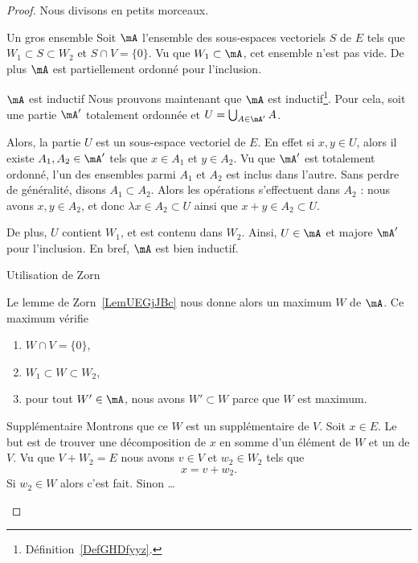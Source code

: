 \begin{proof}
    Nous divisons en petits morceaux.
    \begin{subproof}
        \item[Un gros ensemble]
            Soit \( \mA\) l'ensemble des sous-espaces vectoriels \( S\) de \( E\) tels que \( W_1\subset S\subset W_2\) et \( S\cap V=\{ 0 \}\). Vu que \( W_1\subset \mA\), cet ensemble n'est pas vide. De plus \( \mA\) est partiellement ordonné pour l'inclusion.
        \item[\( \mA\) est inductif]
            Nous prouvons maintenant que \( \mA\) est inductif\footnote{Définition~\ref{DefGHDfyyz}.}. Pour cela, soit une partie \( \mA'\) totalement ordonnée et \( U=\bigcup_{A\in \mA'}A\).

            Alors, la partie \( U\) est un sous-espace vectoriel de \( E\). En effet si \( x,y\in U\), alors il existe \( A_1,A_2\in\mA'\) tels que \( x\in A_1\) et \( y\in A_2\). Vu que \( \mA'\) est totalement ordonné, l'un des ensembles parmi \( A_1\) et \( A_2\) est inclus dans l'autre. Sans perdre de généralité, disons \( A_1\subset A_2\). Alors les opérations s'effectuent dans \( A_2 \) : nous avons \( x,y\in A_2\), et donc \( \lambda x\in A_2\subset U\) ainsi que \( x+y\in A_2\subset U\).

            De plus, \( U \) contient \( W_1 \), et est contenu dans \( W_2\). Ainsi, \( U\in \mA\) et majore \( \mA'\) pour l'inclusion. En bref, \( \mA\) est bien inductif.
        \item[Utilisation de Zorn]

            Le lemme de Zorn~\ref{LemUEGjJBc} nous donne alors un maximum \( W\) de \( \mA\). Ce maximum vérifie
            \begin{enumerate}
                \item
                    \( W\cap V=\{ 0 \}\),
                \item
                    \( W_1\subset W\subset W_2\),
                \item
                    pour tout \( W'\in\mA\), nous avons \( W'\subset W\) parce que \( W\) est maximum.
            \end{enumerate}
        \item[Supplémentaire]
            Montrons que ce \( W\) est un supplémentaire de \( V\). Soit \( x\in E\). Le but est de trouver une décomposition de \( x\) en somme d'un élément de \( W\) et un de \( V\). Vu que \( V+W_2=E\) nous avons \( v\in V\) et \( w_2\in W_2\) tels que 
            \begin{equation}
                x=v+w_2. 
            \end{equation}
            Si \( w_2\in W\) alors c'est fait. Sinon \ldots


\end{subproof}
\end{proof}

